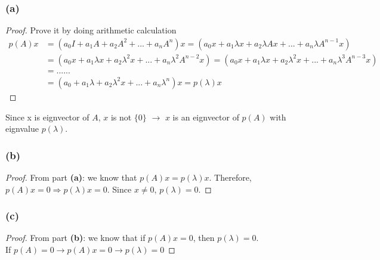 \documentclass{article}
\newtheorem*{proof}{Proof}
\begin{document}
\subsubsection*{(a)}
\begin{proof}
    Prove it by doing arithmetic calculation
    \begin{equation*}
        \begin{split}
            p(A)x &= (a_0I + a_1A + a_2A^2 + ... + a_nA^n)x =(a_0x + a_1 \lambda x + a_2\lambda A x + ... + a_n \lambda A^{n-1}x) \\
            &= (a_0x + a_1 \lambda x + a_2\lambda^2 x + ... + a_n \lambda^2 A^{n-2}x) = (a_0x + a_1 \lambda x + a_2\lambda^2 x + ... + a_n \lambda^3 A^{n-3}x) \\
            &= ...... \\
            & = (a_0 + a_1 \lambda  + a_2\lambda^2 x + ... + a_n \lambda^n)x = p(\lambda)x
        \end{split}
    \end{equation*}
\end{proof}
Since x is eignvector of $A$, $x$ is not $\{0\}$ $\rightarrow$ $x$ is an eignvector of $p(A)$ with eignvalue $p(\lambda)$.

\subsubsection*{(b)}
\begin{proof}
From part \textbf{(a)}: we know that $p(A)x = p(\lambda)x$. Therefore, $p(A)x = 0 \Rightarrow p(\lambda)x = 0$. Since $x \neq 0$, $p(\lambda) = 0$.
\end{proof}

\subsubsection*{(c)}
\begin{proof}
    From part \textbf{(b)}: we know that if $p(A)x = 0$, then $p(\lambda) = 0$. \\
    If $p(A) = 0 \rightarrow p(A)x = 0 \rightarrow p(\lambda) = 0$
\end{proof}
\end{document}
